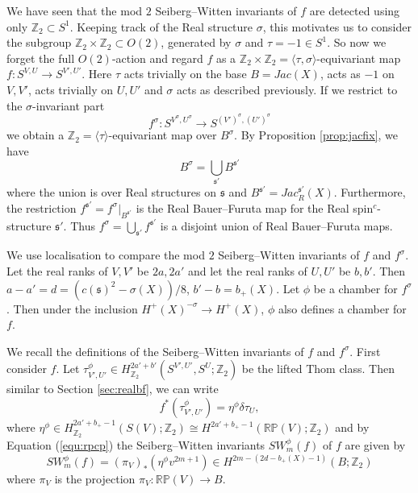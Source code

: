 \documentclass{amsart}
\theoremstyle{definition}
\theoremstyle{remark}
\numberwithin{equation}{section}
\begin{document}
We have seen that the mod $2$ Seiberg--Witten invariants of $f$ are detected using only $\mathbb{Z}_2 \subset S^1$. Keeping track of the Real structure $\sigma$, this motivates us to consider the subgroup $\mathbb{Z}_2 \times \mathbb{Z}_2 \subset O(2)$, generated by $\sigma$ and $\tau = -1 \in S^1$. So now we forget the full $O(2)$-action and regard $f$ as a $\mathbb{Z}_2 \times \mathbb{Z}_2 = \langle \tau,\sigma \rangle$-equivariant map $f : S^{V,U} \to S^{V',U'}$. Here $\tau$ acts trivially on the base $B = Jac(X)$, acts as $-1$ on $V,V'$, acts trivially on $U,U'$ and $\sigma$ acts as described previously. If we restrict to the $\sigma$-invariant part
\[
f^\sigma : S^{V^\sigma , U^\sigma} \to S^{(V')^\sigma , (U')^\sigma}
\]
we obtain a $\mathbb{Z}_2 = \langle \tau \rangle$-equivariant map over $B^\sigma$. By Proposition \ref{prop:jacfix}, we have
\[
B^{\sigma} = \bigcup_{\mathfrak{s}'} B^{\mathfrak{s}'}
\]
where the union is over Real structures on $\mathfrak{s}$ and $B^{\mathfrak{s}'} = Jac_R^{\mathfrak{s}'}(X)$. Furthermore, the restriction $f^{\mathfrak{s}'} = f^\sigma |_{B^{\mathfrak{s}'}}$ is the Real Bauer--Furuta map for the Real spin$^c$-structure $\mathfrak{s}'$. Thus $f^{\sigma} = \bigcup_{\mathfrak{s}'} f^{\mathfrak{s}'}$ is a disjoint union of Real Bauer--Furuta maps.

We use localisation to compare the mod $2$ Seiberg--Witten invariants of $f$ and $f^\sigma$. Let the real ranks of $V,V'$ be $2a,2a'$ and let the real ranks of $U,U'$ be $b,b'$. Then $a-a' = d = (c(\mathfrak{s})^2 - \sigma(X))/8$, $b' - b  = b_+(X)$. Let $\phi$ be a chamber for $f^{\sigma}$. Then under the inclusion $H^+(X)^{-\sigma} \to H^+(X)$, $\phi$ also defines a chamber for $f$. 

We recall the definitions of the Seiberg--Witten invariants of $f$ and $f^\sigma$. First consider $f$. Let $\tau^\phi_{V',U'} \in H^{2a'+b'}_{\mathbb{Z}_2}( S^{V',U'} , S^U ; \mathbb{Z}_2)$ be the lifted Thom class. Then similar to Section \ref{sec:realbf}, we can write
\[
f^*( \tau^\phi_{V',U'} ) = \eta^\phi \delta \tau_U,
\]
where $\eta^\phi \in H^{2a'+b_+-1}_{\mathbb{Z}_2}( S(V) ; \mathbb{Z}_2) \cong H^{2a'+b_+-1}( \mathbb{RP}(V) ; \mathbb{Z}_2)$ and by Equation (\ref{equ:rpcp}) the Seiberg--Witten invariants $SW^\phi_m(f)$ of $f$ are given by
\[
SW^\phi_m(f) = (\pi_V)_*( \eta^\phi v^{2m+1} ) \in H^{2m-(2d-b_+(X)-1)}(B ; \mathbb{Z}_2)
\]
where $\pi_V$ is the projection $\pi_V : \mathbb{RP}(V) \to B$.
\end{document}

